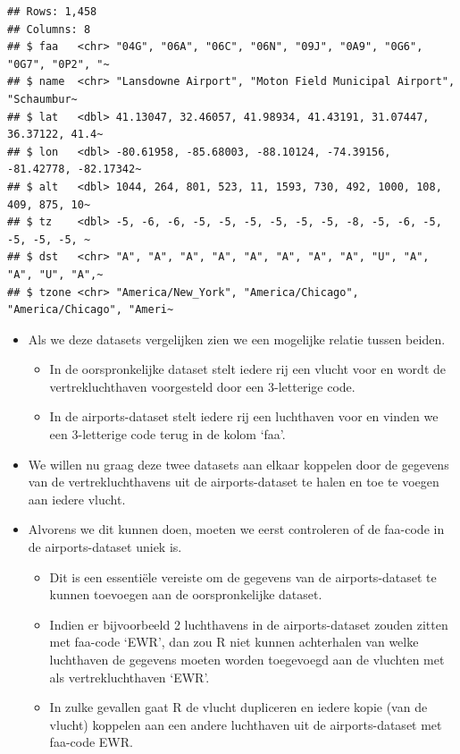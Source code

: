 \documentclass[]{tufte-book}
\providecommand{\tightlist}{%
  \setlength{\itemsep}{0pt}\setlength{\parskip}{0pt}}
\begin{document}
\begin{verbatim}
## Rows: 1,458
## Columns: 8
## $ faa   <chr> "04G", "06A", "06C", "06N", "09J", "0A9", "0G6", "0G7", "0P2", "~
## $ name  <chr> "Lansdowne Airport", "Moton Field Municipal Airport", "Schaumbur~
## $ lat   <dbl> 41.13047, 32.46057, 41.98934, 41.43191, 31.07447, 36.37122, 41.4~
## $ lon   <dbl> -80.61958, -85.68003, -88.10124, -74.39156, -81.42778, -82.17342~
## $ alt   <dbl> 1044, 264, 801, 523, 11, 1593, 730, 492, 1000, 108, 409, 875, 10~
## $ tz    <dbl> -5, -6, -6, -5, -5, -5, -5, -5, -5, -8, -5, -6, -5, -5, -5, -5, ~
## $ dst   <chr> "A", "A", "A", "A", "A", "A", "A", "A", "U", "A", "A", "U", "A",~
## $ tzone <chr> "America/New_York", "America/Chicago", "America/Chicago", "Ameri~
\end{verbatim}

\begin{itemize}
\tightlist
\item
  Als we deze datasets vergelijken zien we een mogelijke relatie tussen beiden.

  \begin{itemize}
  \tightlist
  \item
    In de oorspronkelijke dataset stelt iedere rij een vlucht voor en wordt de vertrekluchthaven voorgesteld door een 3-letterige code.
  \item
    In de airports-dataset stelt iedere rij een luchthaven voor en vinden we een 3-letterige code terug in de kolom `faa'.
  \end{itemize}
\item
  We willen nu graag deze twee datasets aan elkaar koppelen door de gegevens van de vertrekluchthavens uit de airports-dataset te halen en toe te voegen aan iedere vlucht.
\item
  Alvorens we dit kunnen doen, moeten we eerst controleren of de faa-code in de airports-dataset uniek is.

  \begin{itemize}
  \tightlist
  \item
    Dit is een essentiële vereiste om de gegevens van de airports-dataset te kunnen toevoegen aan de oorspronkelijke dataset.
  \item
    Indien er bijvoorbeeld 2 luchthavens in de airports-dataset zouden zitten met faa-code `EWR', dan zou R niet kunnen achterhalen van welke luchthaven de gegevens moeten worden toegevoegd aan de vluchten met als vertrekluchthaven `EWR'.
  \item
    In zulke gevallen gaat R de vlucht dupliceren en iedere kopie (van de vlucht) koppelen aan een andere luchthaven uit de airports-dataset met faa-code EWR.
  \end{itemize}
\end{itemize}
\end{document}
